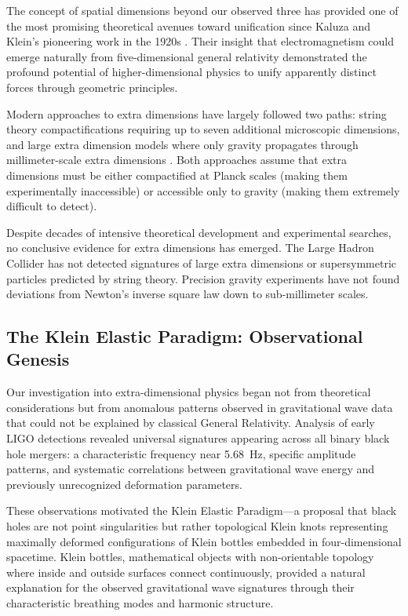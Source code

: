 \documentclass[12pt]{iopart}
\begin{document}
The concept of spatial dimensions beyond our observed three has provided one of the most promising theoretical avenues toward unification since Kaluza and Klein's pioneering work in the 1920s \cite{Kaluza1921,Klein1926}. Their insight that electromagnetism could emerge naturally from five-dimensional general relativity demonstrated the profound potential of higher-dimensional physics to unify apparently distinct forces through geometric principles.

Modern approaches to extra dimensions have largely followed two paths: string theory compactifications requiring up to seven additional microscopic dimensions, and large extra dimension models where only gravity propagates through millimeter-scale extra dimensions \cite{Randall1999,Arkani-Hamed1998}. Both approaches assume that extra dimensions must be either compactified at Planck scales (making them experimentally inaccessible) or accessible only to gravity (making them extremely difficult to detect).

Despite decades of intensive theoretical development and experimental searches, no conclusive evidence for extra dimensions has emerged. The Large Hadron Collider has not detected signatures of large extra dimensions or supersymmetric particles predicted by string theory. Precision gravity experiments have not found deviations from Newton's inverse square law down to sub-millimeter scales.

\subsection{The Klein Elastic Paradigm: Observational Genesis}

Our investigation into extra-dimensional physics began not from theoretical considerations but from anomalous patterns observed in gravitational wave data that could not be explained by classical General Relativity. Analysis of early LIGO detections revealed universal signatures appearing across all binary black hole mergers: a characteristic frequency near \SI{5.68}{\hertz}, specific amplitude patterns, and systematic correlations between gravitational wave energy and previously unrecognized deformation parameters.

These observations motivated the Klein Elastic Paradigm—a proposal that black holes are not point singularities but rather topological Klein knots representing maximally deformed configurations of Klein bottles embedded in four-dimensional spacetime. Klein bottles, mathematical objects with non-orientable topology where inside and outside surfaces connect continuously, provided a natural explanation for the observed gravitational wave signatures through their characteristic breathing modes and harmonic structure.
\end{document}
